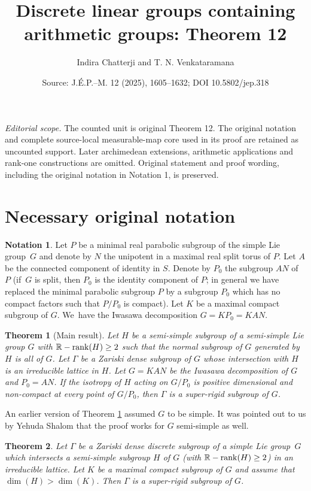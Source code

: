 \documentclass[10pt,a4paper]{amsart}
\title{Discrete linear groups containing arithmetic groups: Theorem 12}
\author{Indira Chatterji and T. N. Venkataramana}
\date{Source: J.\'E.P.--M. 12 (2025), 1605--1632; DOI 10.5802/jep.318}
\newcommand{\Rrank}{\R\textup{-}\rank}
\newtheorem{theorem}{Theorem}
\theoremstyle{definition}
\newtheorem{notation}{Notation}
\newcommand{\field}[1]{\mathbb{#1}}
\newcommand{\R}{\field{R}}
\newcommand{\rank}{{\operatorname{rank}}}
\begin{document}
\maketitle
\noindent\textit{Editorial scope.} The counted unit is original Theorem 12. The original notation and complete source-local measurable-map core used in its proof are retained as uncounted support. Later archimedean extensions, arithmetic applications and rank-one constructions are omitted. Original statement and proof wording, including the original notation in Notation 1, is preserved.
\section{Necessary original notation}
\begin{notation}\label{notation:Lie} Let $P$ be a minimal real parabolic subgroup of the simple Lie group~$G$ and denote by $N$ the unipotent in a maximal real split torus of $P$. Let $A$ be the connected component of identity in $S$. Denote by $P_0$ the subgroup $AN$ of $P$ (if~$G$ is split, then $P_0$ is the identity component of $P$; in general we have replaced the minimal parabolic subgroup $P$ by a subgroup $P_0$ which has no compact factors such that $P/P_0$ is compact). Let $K$ be a maximal compact subgroup of $G$. We~have the Iwasawa decomposition $G=KP_0=KAN$.
\end{notation}

\setcounter{theorem}{2}
\begin{theorem}[Main result]\label{theo:main}
Let $H$ be a semi-simple subgroup of a semi-simple Lie group $G$ with $\Rrank(H)\geq 2$ such that the normal subgroup of $G$ generated by~$H$ is all of $G$. Let $\Gamma $ be a Zariski dense subgroup of $G$ whose intersection with
$H$ is an irreducible lattice in $H$. Let $G=KAN$ be the Iwasawa
decomposition of $G$ and $P_0=AN$. If the isotropy of $H$ acting on $G/P_0$ is positive dimensional and non-compact at every point of $G/P_0$, then $\Gamma $ is a super-rigid subgroup of $G$.
\end{theorem}

An earlier version of Theorem \ref{theo:main} assumed $G$ to be simple. It was pointed out to us by Yehuda Shalom that the proof works for $G$ semi-simple as well.

\begin{theorem} \label{ranktwo} Let $\Gamma $ be a Zariski dense discrete subgroup of a simple Lie group~$G$ which intersects a semi-simple subgroup $H$ of $G$ (with $\Rrank(H)\geq 2$) in an irreducible lattice. Let $K$ be a maximal compact subgroup of $G$ and assume that $\dim (H)> \dim (K)$. Then $\Gamma$ is a super-rigid subgroup of $G$.
\end{theorem}
\end{document}

